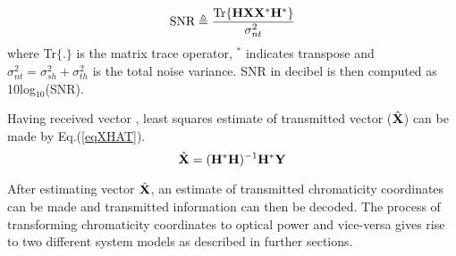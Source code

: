 \begin{equation}
	\text{SNR} \triangleq \frac{\text{Tr}\{{\bf{H}}{\bf{X}}{\bf{X}}^{*}{\bf{H}}^{*}\}}{\sigma^{2}_{nt}}
	\label{eqSNR}
\end{equation}
where Tr$\{.\}$ is the matrix trace operator, $^{*}$ indicates transpose and $\sigma^{2}_{nt}=\sigma^{2}_{sh}+\sigma^{2}_{th}$ is the total noise variance. SNR in decibel is then computed as 10log$^{ }_{10}$(SNR).

Having received vector , least squares estimate of transmitted vector ($\hat{{\bf{X}}}$) can be made by Eq.(\ref{eqXHAT}).
\begin{equation}
	\hat{{\bf{X}}} = ({\bf{H}}^{*}{\bf{H}})^{-1}{\bf{H}}^{*}{\bf{Y}}
	\label{eqXHAT}
\end{equation}

After estimating vector $\hat{{\bf{X}}}$, an estimate of transmitted chromaticity coordinates can be made and transmitted information can then be decoded. The process of transforming chromaticity coordinates to optical power and vice-versa gives rise to two different system models as described in further sections.
